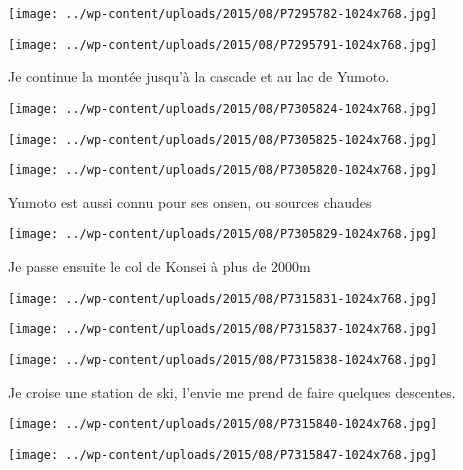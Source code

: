  \newline
\centerline{\texttt{[image: ../wp-content/uploads/2015/08/P7295782-1024x768.jpg]} } 
 \newline
 \newline
\centerline{\texttt{[image: ../wp-content/uploads/2015/08/P7295791-1024x768.jpg]} } 
 \newline
 Je continue la montée jusqu'à la cascade et au lac de Yumoto. \newline
 \newline
\centerline{\texttt{[image: ../wp-content/uploads/2015/08/P7305824-1024x768.jpg]} } 
 \newline
 \newline
\centerline{\texttt{[image: ../wp-content/uploads/2015/08/P7305825-1024x768.jpg]} } 
 \newline
 \newline
\centerline{\texttt{[image: ../wp-content/uploads/2015/08/P7305820-1024x768.jpg]} } 
 \newline
 Yumoto est aussi connu pour ses onsen, ou sources chaudes \newline
 \newline
\centerline{\texttt{[image: ../wp-content/uploads/2015/08/P7305829-1024x768.jpg]} } 
 \newline
 Je passe ensuite le col de Konsei à plus de 2000m \newline
 \newline
\centerline{\texttt{[image: ../wp-content/uploads/2015/08/P7315831-1024x768.jpg]} } 
 \newline
 \newline
\centerline{\texttt{[image: ../wp-content/uploads/2015/08/P7315837-1024x768.jpg]} } 
 \newline
 \newline
\centerline{\texttt{[image: ../wp-content/uploads/2015/08/P7315838-1024x768.jpg]} } 
 \newline
 Je croise une station de ski, l'envie me prend de faire quelques descentes. \newline
 \newline
\centerline{\texttt{[image: ../wp-content/uploads/2015/08/P7315840-1024x768.jpg]} } 
 \newline
 \newline
\centerline{\texttt{[image: ../wp-content/uploads/2015/08/P7315847-1024x768.jpg]} } 
 \newline
